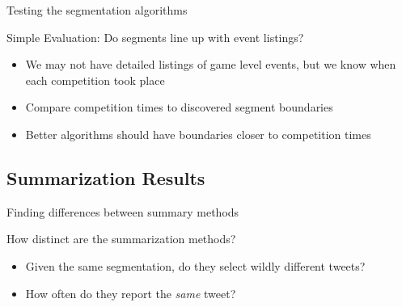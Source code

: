 \documentclass[compress]{beamer}
\begin{document}
\begin{frame}{Testing the segmentation algorithms}
\begin{block}{Simple Evaluation: Do segments line up with event listings?}
\begin{itemize}
\item We may not have detailed listings of game level events, but we know when
each competition took place
\item Compare competition times to discovered segment boundaries
\item Better algorithms should have boundaries closer to competition times
\end{itemize}
\end{block}


\end{frame}

\subsection{Summarization Results}

\begin{frame}{Finding differences between summary methods}
\begin{block}{How distinct are the summarization methods?}
\begin{itemize}
\item Given the same segmentation, do they select wildly different tweets?
\item How often do they report the \textit{same} tweet?
\end{itemize}
\end{block}
\end{frame}
\end{document}
